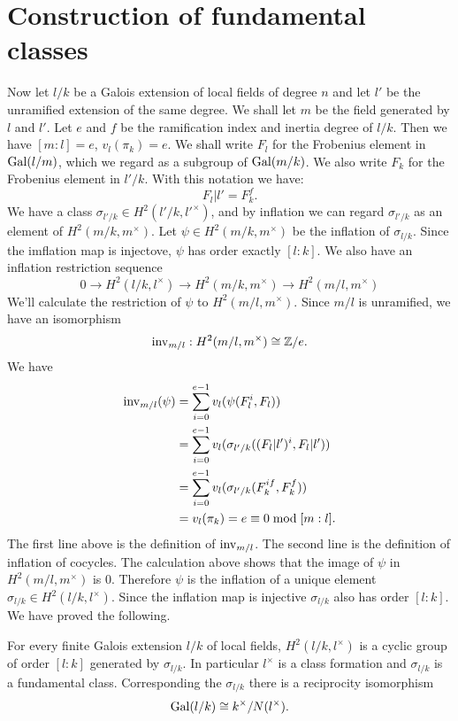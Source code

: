 \section{Construction of fundamental classes}

Now let $l/k$ be a Galois extension of local fields of degree $n$ and let $l'$ be
the unramified extension of the same degree.
We shall let $m$ be the field generated by $l$ and $l'$.
Let $e$ and $f$ be the ramification index and inertia degree of $l/k$.
Then we have $[m:l] = e$, $v_l(\pi_k)= e$.
We shall write $F_l$ for the Frobenius element in $\mathrm{Gal}(l/m)$, which we regard as a subgroup
of $\mathrm{Gal}(m/k)$. We also write $F_k$ for the Frobenius element in $l'/k$.
With this notation we have:
\[
	F_l|l' = F_k^f.
\]
We have a class $\sigma_{l'/k} \in H^2(l'/k,l'^\times)$, and by inflation we can regard
$\sigma_{l'/k}$ as an element of $H^2(m/k,m^\times)$.
Let $\psi\in H^2(m/k,m^\times)$ be the inflation of $\sigma_{l/k}$.
Since the imflation map is injectove, $\psi$ has order exactly $[l:k]$.
We also have an inflation restriction sequence
\[
	0 \to H^2(l/k, l^\times) \to H^2(m/k , m^\times) \to H^2(m/l, m^\times)
\]
We'll calculate the restriction of $\psi$ to $H^2(m/l, m^\times)$.
Since $m/l$ is unramified, we have an isomorphism
\[
	\mathrm{inv}_{m/l} : H^2(m/l, m^\times) \cong {\mathbb Z}/ e.
\]
We have
\begin{align*}
	\mathrm{inv}_{m/l}(\psi)
	&=\sum_{i=0}^{e-1} v_l (\psi (F_l^i,F_l))\\
	&=\sum_{i=0}^{e-1} v_l (\sigma_{l'/k}((F_l|l')^i,F_l|l'))\\
	&=\sum_{i=0}^{e-1} v_l (\sigma_{l'/k}(F_k^{if},F_k^f))\\
	&=v_l (\pi_k) = e \equiv 0 \bmod [m:l].
\end{align*}
The first line above is the definition of $\mathrm{inv}_{m/l}$.
The second line is the definition of inflation of cocycles.
The calculation above shows that the image of $\psi$ in $H^2(m/l, m^\times)$ is $0$.
Therefore $\psi$ is the inflation of a unique element $\sigma_{l/k} \in H^2(l/k,l^\times)$.
Since the inflation map is injective $\sigma_{l/k}$ also has order $[l:k]$.
We have proved the following.

\begin{theorem} \label{H2 local cyclic}
	For every finite Galois extension $l/k$ of local fields,
	$H^2(l/k,l^\times)$ is a cyclic group of order $[l:k]$ generated by $\sigma_{l/k}$.
	In particular $l^\times$ is a class formation and $\sigma_{l/k}$ is a fundamental class.
	Corresponding the $\sigma_{l/k}$ there is a reciprocity isomorphism
	\[
		\mathrm{Gal}(l/k) \cong k^\times / N(l^\times).
	\]
\end{theorem}



